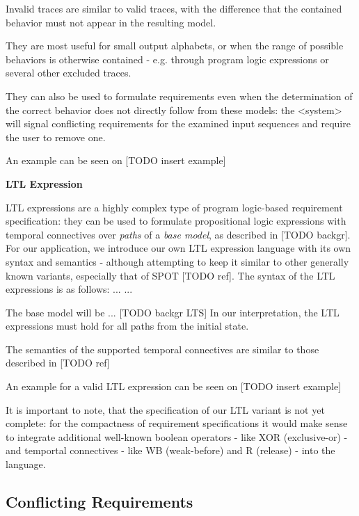 Invalid traces are similar to valid traces, with the difference that the contained behavior must not appear in the resulting model. 

They are most useful for small output alphabets, or when the range of possible behaviors is otherwise contained - e.g. through program logic expressions or several other excluded traces.

They can also be used to formulate requirements even when the determination of the correct behavior does not directly follow from these models: the <system> will signal conflicting requirements for the examined input sequences and require the user to remove one.

An example can be seen on [TODO insert example]

\textbf{LTL Expression}

LTL expressions are a highly complex type of program logic-based requirement specification: they can be used to formulate propositional logic expressions with temporal connectives over \textit{paths} of a \textit{base model}, as described in [TODO backgr]. For our application, we introduce our own LTL expression language with its own syntax and semantics - although attempting to keep it similar to other generally known variants, especially that of SPOT [TODO ref].
The syntax of the LTL expressions is as follows:
...
...

The base model will be ... [TODO backgr LTS]
In our interpretation, the LTL expressions must hold for all paths from the initial state.

The semantics of the supported temporal connectives are similar to those described in [TODO ref] %

An example for a valid LTL expression can be seen on [TODO insert example]

It is important to note, that the specification of our LTL variant is not yet complete: for the compactness of requirement specifications it would make sense to integrate additional well-known boolean operators - like XOR (exclusive-or) - and temportal connectives - like WB (weak-before) and R (release) - into the language. 

\subsection{Conflicting Requirements} \label{subs_conf}

